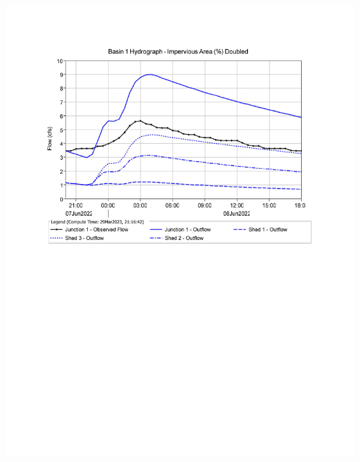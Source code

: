 \documentclass{article}
\begin{document}
\begin{center}
    \includegraphics*[scale=0.7, trim = {0 13cm 0 3.1cm}]{results/Basin_1_Hydrograph_-_Impervious_Area_Doubled.pdf}
\end{center}
\newpage
\end{document}
